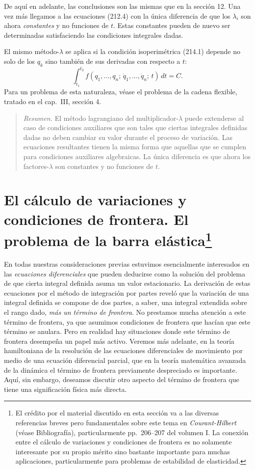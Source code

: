 \documentclass[12pt,a4paper]{book}
\begin{document}
De aquí en adelante, las conclusiones son las mismas que en la sección 12. Una vez más llegamos a las ecuaciones (212.4) con la única diferencia de que los $\lambda_i$ son ahora \textit{constantes} y no funciones de $t$. Estas constantes pueden de nuevo ser determinadas satisfaciendo las condiciones integrales dadas.

El mismo método-$\lambda$ se aplica si la condición isoperimétrica (214.1) depende no solo de los $q_k$ sino también de sus derivadas con respecto a $t$:
\begin{equation}
\int_{t_1}^{t_2} f(q_1, \ldots, q_n;\, \dot{q}_1, \ldots, \dot{q}_n;\, t) \, dt = C. \tag{214.7}
\end{equation}
Para un problema de esta naturaleza, véase el problema de la cadena flexible, tratado en el cap.\ III, sección 4.

\begin{quote}
\textit{Resumen.} El método lagrangiano del multiplicador-$\lambda$ puede extenderse al caso de condiciones auxiliares que son tales que ciertas integrales definidas dadas no deben cambiar su valor durante el proceso de variación. Las ecuaciones resultantes tienen la misma forma que aquellas que se cumplen para condiciones auxiliares algebraicas. La única diferencia es que ahora los factores-$\lambda$ son constantes y no funciones de $t$.
\end{quote}

\section{El cálculo de variaciones y condiciones de frontera. El problema de la barra elástica\protect\footnote{El crédito por el material discutido en esta sección va a las diversas referencias breves pero fundamentales sobre este tema en \textit{Courant-Hilbert} (véase Bibliografía), particularmente pp.\ 206--207 del volumen I. La conexión entre el cálculo de variaciones y condiciones de frontera es no solamente interesante por su propio mérito sino bastante importante para muchas aplicaciones, particularmente para problemas de estabilidad de elasticidad.}}

En todas nuestras consideraciones previas estuvimos esencialmente interesados en las \textit{ecuaciones diferenciales} que pueden deducirse como la solución del problema de que cierta integral definida asuma un valor estacionario. La derivación de estas ecuaciones por el método de integración por partes reveló que la variación de una integral definida se compone de dos partes, a saber, una integral extendida sobre el rango dado, \textit{más un término de frontera}. No prestamos mucha atención a este término de frontera, ya que asumimos condiciones de frontera que hacían que este término se anulara. Pero en realidad hay situaciones donde este término de frontera desempeña un papel más activo. Veremos más adelante, en la teoría hamiltoniana de la resolución de las ecuaciones diferenciales de movimiento por medio de una ecuación diferencial parcial, que en la teoría matemática avanzada de la dinámica el término de frontera previamente despreciado es importante. Aquí, sin embargo, deseamos discutir otro aspecto del término de frontera que tiene una significación física más directa.
\end{document}
